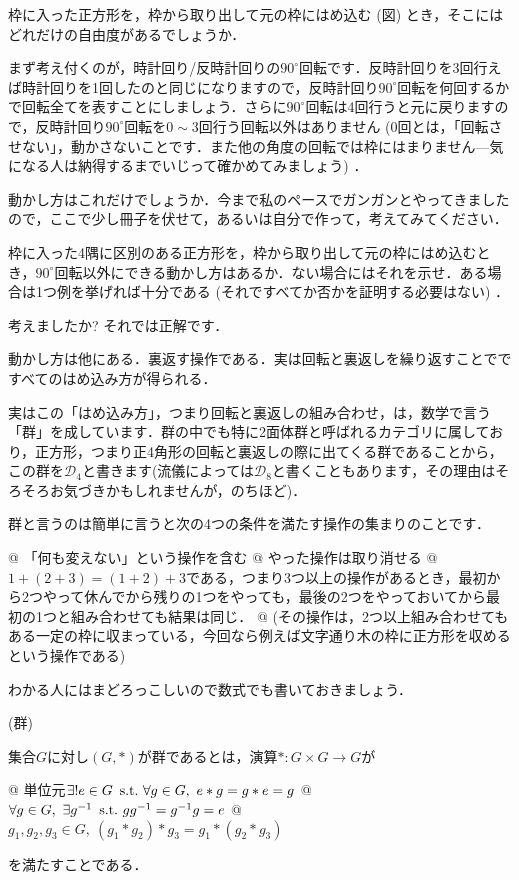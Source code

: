 \documentclass[11pt]{jsarticle}
\begin{document}
枠に入った正方形を，枠から取り出して元の枠にはめ込む (図) とき，そこにはどれだけの自由度があるでしょうか．

まず考え付くのが，時計回り/反時計回りの$90^\circ$回転です．反時計回りを3回行えば時計回りを1回したのと同じになりますので，反時計回り$90^\circ$回転を何回するかで回転全てを表すことにしましょう．さらに$90^\circ$回転は4回行うと元に戻りますので，反時計回り$90^\circ$回転を$0\sim 3$回行う回転以外はありません (0回とは，「回転させない」，動かさないことです．また他の角度の回転では枠にはまりません---気になる人は納得するまでいじって確かめてみましょう) ．

動かし方はこれだけでしょうか．今まで私のペースでガンガンとやってきましたので，ここで少し冊子を伏せて，あるいは自分で作って，考えてみてください．
\begin{screen}
\begin{prob}
  枠に入った4隅に区別のある正方形を，枠から取り出して元の枠にはめ込むとき，$90^\circ$回転以外にできる動かし方はあるか．ない場合にはそれを示せ．ある場合は1つ例を挙げれば十分である (それですべてか否かを証明する必要はない) ．
\end{prob}
\end{screen}
考えましたか? それでは正解です．
\begin{ans*}
  動かし方は他にある．裏返す操作である．実は回転と裏返しを繰り返すことでですべてのはめ込み方が得られる．
\end{ans*}

実はこの「はめ込み方」，つまり回転と裏返しの組み合わせ，は，数学で言う「群」を成しています．群の中でも特に2面体群と呼ばれるカテゴリに属しており，正方形，つまり正4角形の回転と裏返しの際に出てくる群であることから，この群を$\mathcal{D}_4$と書きます(流儀によっては$\mathcal{D}_8$と書くこともあります，その理由はそろそろお気づきかもしれませんが，のちほど)．

群と言うのは簡単に言うと次の4つの条件を満たす操作の集まりのことです．
\begin{easylist}[enumerate]
  @ 「何も変えない」という操作を含む
  @ やった操作は取り消せる
  @ $1 + (2 + 3) = (1 + 2) + 3 $である，つまり3つ以上の操作があるとき，最初から2つやって休んでから残りの1つをやっても，最後の2つをやっておいてから最初の1つと組み合わせても結果は同じ．
  @ (その操作は，2つ以上組み合わせてもある一定の枠に収まっている，今回なら例えば文字通り木の枠に正方形を収めるという操作である)
\end{easylist}
わかる人にはまどろっこしいので数式でも書いておきましょう．
\begin{defi}(群)
  
集合$G$に対し$(G,*)$が群であるとは，演算$*\colon G\times G\to G$が
\begin{easylist}[itemize]
  @ 単位元$\exists ! e\in G\operatorname{\ \text{s.t.}\,} \forall g\in G,\ e*g = g*e = g$
  @ $\forall g\in G,\ \exists \inv{g}\st g\inv{g} = \inv{g}g = e $
  @ $g_1,g_2,g_3\in G,\ (g_1*g_2)*g_3 = g_1*(g_2*g_3)$
\end{easylist}
を満たすことである．
\end{defi}
\end{document}
